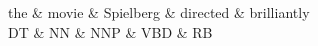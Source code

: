 \documentclass{article}
\begin{document}
\thispagestyle{empty}
\begin{center}
 \begin{dependency}[theme = default]
   \begin{deptext}[column sep=1em]
   the \& movie \& Spielberg \& directed \& brilliantly \\
   DT \& NN \& NNP \& VBD \& RB \\
   \end{deptext}
\end{dependency} \\
\end{center}
\end{document}
